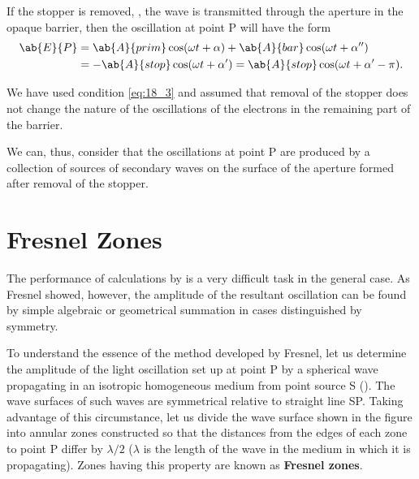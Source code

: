 If the stopper is removed, \ie, the wave is transmitted through the aperture in the opaque barrier, then the oscillation at point P will have the form
\begin{align*}
    \ab{E}{P} &= \ab{A}{prim} \cos(\omega t+\alpha) + \ab{A}{bar} \cos(\omega t+\alpha'') \\
    &= - \ab{A}{stop} \cos(\omega t+\alpha') = \ab{A}{stop} \cos(\omega t+\alpha'-\pi).
\end{align*}

We have used condition \eqref{eq:18_3} and assumed that removal of the stopper does not change the nature of the oscillations of the electrons in the remaining part of the barrier.

We can, thus, consider that the oscillations at point P are produced by a collection of sources of secondary waves on the surface of the aperture formed after removal of the stopper.

\section{Fresnel Zones}\label{sec:18_3}

The performance of calculations by  is a very difficult task in the general case.
As Fresnel showed, however, the amplitude of the resultant oscillation can be found by simple algebraic or geometrical summation in cases distinguished by symmetry.

To understand the essence of the method developed by Fresnel, let us determine the amplitude of the light oscillation set up at point P by a spherical wave propagating in an isotropic homogeneous medium from point source S ().
The wave surfaces of such waves are symmetrical relative to straight line SP.
Taking advantage of this circumstance, let us divide the wave surface shown in the figure into annular zones constructed so that the distances from the edges of each zone to point P differ by $\lambda/2$ ($\lambda$ is the length of the wave
in the medium in which it is propagating).
Zones having this property are known as \textbf{Fresnel zones}.

